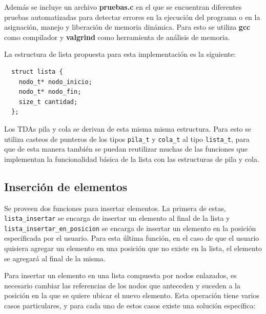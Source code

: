 \documentclass[titlepage,a4paper]{article}
\begin{document}
Además se incluye un archivo \textbf{pruebas.c} en el que se encuentran diferentes pruebas automatizadas para detectar errores en la ejecución del programa o en la asignación, manejo y liberación de memoria dinámica. Para esto se utiliza \textbf{gcc} como compilador y \textbf{valgrind} como herramienta de análisis de memoria.

La estructura de lista propuesta para esta implementación es la siguiente:

\begin{lstlisting}
  struct lista {
    nodo_t* nodo_inicio;
    nodo_t* nodo_fin;
    size_t cantidad;
  };
\end{lstlisting}

Los TDAs pila y cola se derivan de esta misma misma estructura. Para esto se utiliza casteos de punteros de los tipos \lstinline{pila_t} y \lstinline{cola_t} al tipo \lstinline{lista_t}, para que de esta manera también se puedan reutilizar muchas de las funciones que implementan la funcionalidad básica de la lista con las estructuras de pila y cola.

\subsection{Inserción de elementos}
Se proveen dos funciones para insertar elementos. La primera de estas, \lstinline{lista_insertar} se encarga de insertar un elemento al final de la lista y \lstinline{lista_insertar_en_posicion} se encarga de insertar un elemento en la posición especificada por el usuario. Para esta última función, en el caso de que el usuario quisiera agregar un elemento en una posición que no existe en la lista, el elemento se agregará al final de la misma.

Para insertar un elemento en una lista compuesta por nodos enlazados, es necesario cambiar las referencias de los nodos que anteceden y suceden a la posición en la que se quiere ubicar el nuevo elemento. Esta operación tiene varios casos particulares, y para cada uno de estos casos existe una solución específica:
\end{document}
